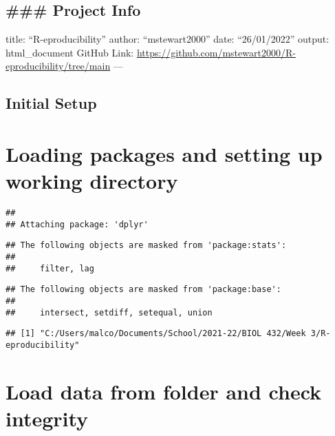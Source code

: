 \documentclass[
]{article}
\author{}
\date{\vspace{-2.5em}}
\begin{document}
\hypertarget{project-info}{%
\subsection{\#\#\# Project Info}\label{project-info}}

title: ``R-eproducibility'' author: ``mstewart2000'' date:
``26/01/2022'' output: html\_document GitHub Link:
\url{https://github.com/mstewart2000/R-eproducibility/tree/main} ---

\hypertarget{initial-setup}{%
\subsection{Initial Setup}\label{initial-setup}}

\hypertarget{loading-packages-and-setting-up-working-directory}{%
\section{Loading packages and setting up working
directory}\label{loading-packages-and-setting-up-working-directory}}

\begin{verbatim}
## 
## Attaching package: 'dplyr'
\end{verbatim}

\begin{verbatim}
## The following objects are masked from 'package:stats':
## 
##     filter, lag
\end{verbatim}

\begin{verbatim}
## The following objects are masked from 'package:base':
## 
##     intersect, setdiff, setequal, union
\end{verbatim}

\begin{verbatim}
## [1] "C:/Users/malco/Documents/School/2021-22/BIOL 432/Week 3/R-eproducibility"
\end{verbatim}

\hypertarget{load-data-from-folder-and-check-integrity}{%
\section{Load data from folder and check
integrity}\label{load-data-from-folder-and-check-integrity}}
\end{document}
